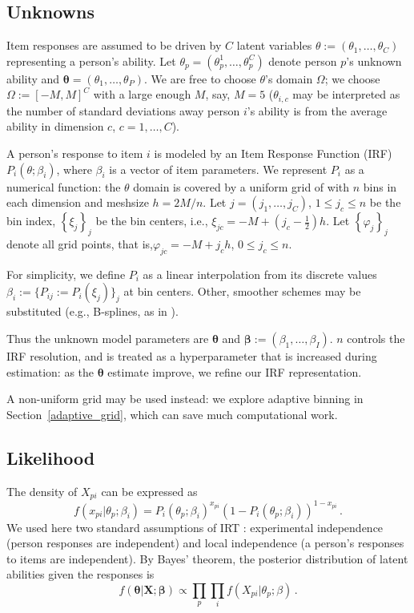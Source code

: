 \documentclass{article}
\newcommand{\bX}{\mathbf{X}}
\newcommand{\ta}{\theta}
\newcommand{\bbeta}{\boldsymbol\beta}
\newcommand{\bta}{\boldsymbol\ta}
\begin{document}
\subsection{Unknowns}
Item responses are assumed to be driven by $C$ latent variables $\ta := (\ta_1,\dots,\ta_C)$ representing a person's ability. Let $\ta_p=(\ta_p^1,\dots,\ta_p^C)$ denote person $p$'s unknown ability and $\bta = (\ta_1,\dots,\ta_P)$. We are free to choose $\ta$'s domain $\Omega$; we choose $\Omega := [-M,M]^C$ with a large enough $M$, say, $M = 5$ ($\ta_{i,c}$ may be interpreted as the number of standard deviations away person $i$'s ability is from the average ability in dimension $c$, $c=1,\dots,C$).

A person's response to item $i$ is modeled by an Item Response Function (IRF) $P_i(\ta;\beta_i)$, where $\beta_i$ is a vector of item parameters. We represent $P_i$ as a numerical function: the $\ta$ domain is covered by a uniform grid of with $n$ bins in each dimension and meshsize $h = 2 M / n$. Let $j=(j_1,\dots,j_C)$, $1 \leq j_c \leq n$ be the bin index, $\left\{\xi_j \right\}_j$ be the bin centers, i.e., $\xi_{jc} = -M + (j_c - \frac12) h$. Let $\left\{\varphi_j\right\}_j$ denote all grid points, that is,$\varphi_{jc} = -M + j_c h$, $0 \leq j_c \leq n$.

For simplicity, we define $P_i$ as a linear interpolation from its discrete values $\beta_i := \{P_{ij} := P_i(\xi_j)\}_j$ at bin centers. Other, smoother schemes may be substituted (e.g., B-splines, as in \cite{matt_bsplines}).

Thus the unknown model parameters are $\bta$ and $\bbeta := (\beta_1,\dots,\beta_I)$. $n$ controls the IRF resolution, and is treated as a hyperparameter that is increased during estimation: as the $\bta$ estimate improve, we refine our IRF representation.

A non-uniform grid may be used instead: we explore adaptive binning in Section~\ref{adaptive_grid}, which can save much computational work. 

\subsection{Likelihood}
The density of $X_{pi}$ can be expressed as 
\begin{equation}
  f(x_{pi}|\ta_p;\beta_i) = P_i(\ta_p;\beta_i)^{x_{pi}} \left(1 - P_i(\ta_p;\beta_i)\right)^{1-x_{pi}}\,.
\end{equation}
We used here two standard assumptions of IRT \cite{junker}: experimental independence (person responses are independent) and local independence (a person's responses to items are independent). By Bayes' theorem, the posterior distribution of latent abilities given the responses is
\begin{equation}
  f(\bta|\bX;\bbeta) \propto\prod_p \prod_i f(X_{pi}|\ta_p;\beta)\,.
  \label{like}
\end{equation}
\end{document}
